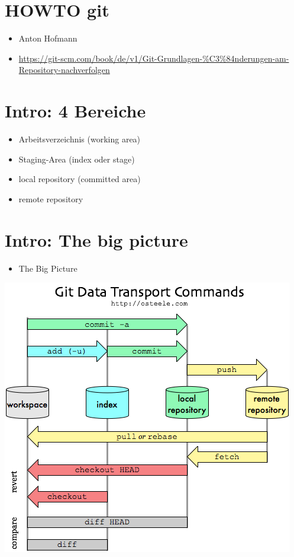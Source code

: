 \documentclass[11pt]{article}
\author{Anton Hofmann}
\date{\today}
\title{}
\begin{document}
\tableofcontents

\section{HOWTO git}
\label{sec:org3a6aa28}

\begin{itemize}
\item Anton Hofmann

\item \url{https://git-scm.com/book/de/v1/Git-Grundlagen-\%C3\%84nderungen-am-Repository-nachverfolgen}
\end{itemize}



\section{Intro: 4 Bereiche}
\label{sec:orged7d822}

\begin{itemize}
\item Arbeitsverzeichnis (working area)
\item Staging-Area (index oder stage)
\item local repository (committed area)
\item remote repository
\end{itemize}


\section{Intro: The big picture}
\label{sec:orgc0aa598}

\begin{itemize}
\item The Big Picture
\end{itemize}

\begin{center}
\includegraphics[width=.9\linewidth]{./img/git-tbp.png}
\end{center}
\end{document}
